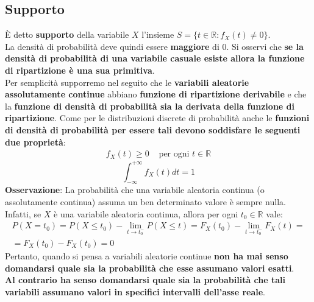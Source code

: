 \subsection{Supporto}
È detto \textbf{supporto} della variabile $X$ l'insieme $S = \{t \in \mathbb{R}:f_X(t) \neq 0 \}$. \\
La densità di probabilità deve quindi essere \textbf{maggiore} di 0.
Si osservi che \textbf{se la densità di probabilità di una variabile casuale esiste allora la
funzione di ripartizione è una sua primitiva}. \\
Per semplicità supporremo nel seguito che le \textbf{variabili aleatorie assolutamente continue} abbiano \textbf{funzione di ripartizione derivabile }e che la \textbf{funzione di densità di probabilità sia la derivata della funzione di ripartizione}.
Come per le distribuzioni discrete di probabilità anche le \textbf{funzioni di densità di probabilità per essere tali devono soddisfare le seguenti due proprietà}:
\begin{align*}
f_X(t) \geq 0 & \text{ per ogni } t \in \mathbb{R}
\end{align*}
\[
\int_{-\infty}^{+\infty} f_X(t)dt = 1
\]
\textbf{Osservazione}: La probabilità che una variabile aleatoria continua (o assolutamente continua) assuma un ben determinato valore è sempre nulla. Infatti, se $X$ è una variabile aleatoria continua, allora per ogni $t_0 \in \mathbb{R}$ vale:
\begin{equation}
	\begin{split}
	P(X = t_0) = P(X \leq t_0) - \lim_{t \to t_0^-} P(X \leq t) = F_X (t_0) - \lim_{t \to t_0^-}  F_X(t) = \\ = F_X(t_0) - F_X(t_0) = 0
	\end{split}
\end{equation}
Pertanto, quando si pensa a variabili aleatorie continue \textbf{non ha mai senso domandarsi quale sia la probabilità che esse assumano valori esatti}. \\
\textbf{Al contrario ha senso domandarsi quale sia la probabilità che tali variabili assumano valori in specifici intervalli dell’asse reale}.

